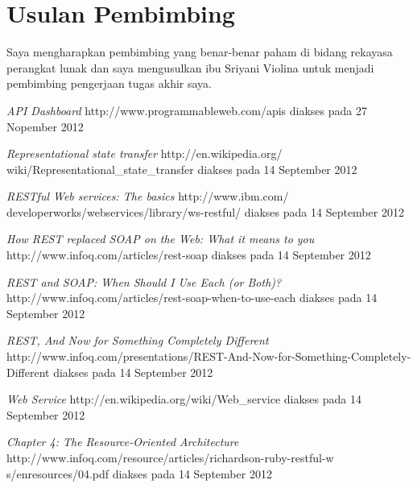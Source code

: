 \documentclass[a4paper, 12pt]{report}
\begin{document}
\section*{Usulan Pembimbing}
\onehalfspacing Saya mengharapkan pembimbing yang benar-benar paham di bidang rekayasa perangkat lunak dan saya mengusulkan ibu Sriyani Violina untuk menjadi pembimbing pengerjaan tugas akhir saya.

\begin{thebibliography}{99}
\singlespacing 

  \emph{API Dashboard}
  http://www.programmableweb.com/apis
  diakses pada 27 Nopember 2012

  \emph{Representational state transfer}
  http://en.wikipedia.org/\\wiki/Representational\_state\_transfer
  diakses pada 14 September 2012 

  \emph{RESTful Web services: The basics}
  http://www.ibm.com/\\developerworks/webservices/library/ws-restful/
  diakses pada 14 September 2012
  
  \emph{How REST replaced SOAP on the Web: What it means to you}
  http://www.infoq.com/articles/rest-soap
  diakses pada 14 September 2012
  
  \emph{REST and SOAP: When Should I Use Each (or Both)?}
  http://www.infoq.com/articles/rest-soap-when-to-use-each
  diakses pada 14 September 2012
  
  \emph{REST, And Now for Something Completely Different}
  http://www.infoq.com/presentations/REST-And-Now-for-Something-Completely-Different
  diakses pada 14 September 2012
  
  \emph{Web Service}
  http://en.wikipedia.org/wiki/Web\_service
  diakses pada 14 September 2012
  
  \emph{Chapter 4: The Resource-Oriented Architecture}
  http://www.infoq.com/resource/articles/richardson-ruby-restful-w  s/enresources/04.pdf
  diakses pada 14 September 2012

\end{thebibliography}
\end{document}
